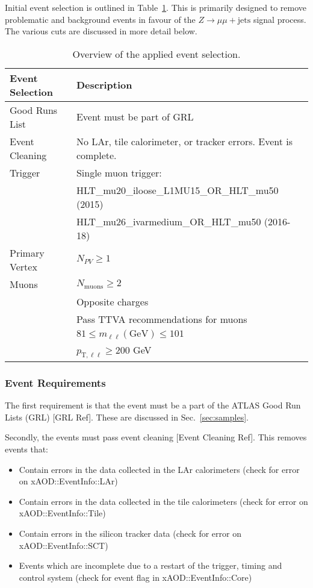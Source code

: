 Initial event selection is outlined in Table~\ref{lab:eventsel}. This is primarily designed to remove problematic and background events in favour of the $Z\rightarrow\mu\mu + \text{jets}$ signal process. The various cuts are discussed in more detail below.

\begin{table}[h!]
    \centering
    \begin{tabular}{l|l}
         \hline
    \textbf{Event Selection} & \textbf{Description} \\ \hline
    Good Runs List & Event must be part of GRL \\ \hline
    Event Cleaning & No LAr, tile calorimeter, or tracker errors. Event is complete. \\ \hline
    Trigger & Single muon trigger: \\
    & HLT\_mu20\_iloose\_L1MU15\_OR\_HLT\_mu50 (2015) \\
    & HLT\_mu26\_ivarmedium\_OR\_HLT\_mu50 (2016-18) \\ \hline
    Primary Vertex & $N_{PV}\geq1$ \\ \hline
    Muons & $N_{\text{muons}}\geq2$ \\
          & Opposite charges \\
          & Pass TTVA recommendations for muons \\
          & $81\leq m_{\ell\ell} (\text{GeV})\leq 101$ \\
          & $p_{\text{T},\ell\ell}\geq200$ GeV \\ \hline
    \end{tabular}
    \caption{Overview of the applied event selection.}
    \label{lab:eventsel}
\end{table}

\subsubsection{Event Requirements}
The first requirement is that the event must be a part of the ATLAS Good Run Lists (GRL) [GRL Ref]. These are discussed in Sec.~\ref{sec:samples}.

Secondly, the events must pass event cleaning [Event Cleaning Ref]. This removes events that:
\begin{itemize}
    \item Contain errors in the data collected in the LAr calorimeters (check for error on xAOD::EventInfo::LAr)
    \item Contain errors in the data collected in the tile calorimeters (check for error on xAOD::EventInfo::Tile)
    \item Contain errors in the silicon tracker data (check for error on xAOD::EventInfo::SCT)
    \item Events which are incomplete due to a restart of the trigger, timing and control system (check for event flag in xAOD::EventInfo::Core)
\end{itemize}

